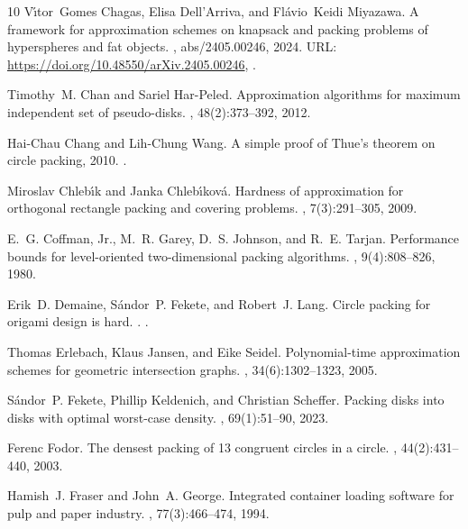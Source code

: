 \documentclass[10pt,a4paper]{article}
\theoremstyle{plain}
\theoremstyle{plain}
\theoremstyle{plain}
\theoremstyle{definition}
\begin{document}
{\begin{thebibliography}{10}
V{\'{\i}}tor~Gomes Chagas, Elisa Dell'Arriva, and Fl{\'{a}}vio~Keidi Miyazawa.
\newblock A framework for approximation schemes on knapsack and packing problems of hyperspheres and fat objects.
, abs/2405.00246, 2024.
\newblock URL: \url{https://doi.org/10.48550/arXiv.2405.00246}, \href {https://doi.org/10.48550/ARXIV.2405.00246} {}.

Timothy~M. Chan and Sariel Har{-}Peled.
\newblock Approximation algorithms for maximum independent set of pseudo-disks.
, 48(2):373--392, 2012.

Hai-Chau Chang and Lih-Chung Wang.
\newblock A simple proof of {T}hue's theorem on circle packing, 2010.
\newblock \href {https://arxiv.org/abs/1009.4322} {}.

Miroslav Chleb{\'{\i}}k and Janka Chleb{\'{\i}}kov{\'{a}}.
\newblock Hardness of approximation for orthogonal rectangle packing and covering problems.
, 7(3):291--305, 2009.

E.~G. Coffman, Jr., M.~R. Garey, D.~S. Johnson, and R.~E. Tarjan.
\newblock Performance bounds for level-oriented two-dimensional packing algorithms.
, 9(4):808--826, 1980.

Erik~D. Demaine, S{\'{a}}ndor~P. Fekete, and Robert~J. Lang.
\newblock Circle packing for origami design is hard.
.
\newblock \href {https://arxiv.org/abs/1008.1224} {}.

Thomas Erlebach, Klaus Jansen, and Eike Seidel.
\newblock Polynomial-time approximation schemes for geometric intersection graphs.
, 34(6):1302--1323, 2005.

S{\'a}ndor~P. Fekete, Phillip Keldenich, and Christian Scheffer.
\newblock Packing disks into disks with optimal worst-case density.
, 69(1):51--90, 2023.

Ferenc Fodor.
\newblock The densest packing of 13 congruent circles in a circle.
, 44(2):431--440, 2003.

Hamish~J. Fraser and John~A. George.
\newblock Integrated container loading software for pulp and paper industry.
, 77(3):466--474, 1994.


\end{thebibliography}}
\end{document}
